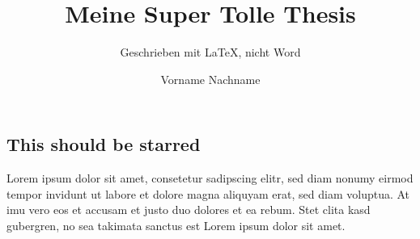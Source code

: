 \documentclass[a4paper,hidelinks,12pt]{report}
\author{Vorname Nachname}
\title{Meine Super Tolle Thesis}
\subtitle{Geschrieben mit \LaTeX , nicht Word}
\begin{document}
\setlength{\parindent}{0pt}
\setlength{\parskip}{1.2ex plus 0.5ex minus 0.2ex}

\hstitlepage

\begin{frontmatter}


\chapter*{This should be starred}
Lorem ipsum dolor sit amet, consetetur sadipscing elitr, sed diam nonumy eirmod tempor invidunt ut labore et dolore magna aliquyam erat, sed diam voluptua. At \gls{imu} vero eos et accusam et justo duo dolores et ea rebum. Stet clita kasd gubergren, no sea takimata sanctus est Lorem ipsum dolor sit amet.

\tableofcontents

\end{frontmatter}


\printbibliography[heading=bibintoc, title={Literatur}]
\cleardoublepage
{}

\listoftables
\cleardoublepage
{}

\listoffigures

\printglossaries

\end{document}
